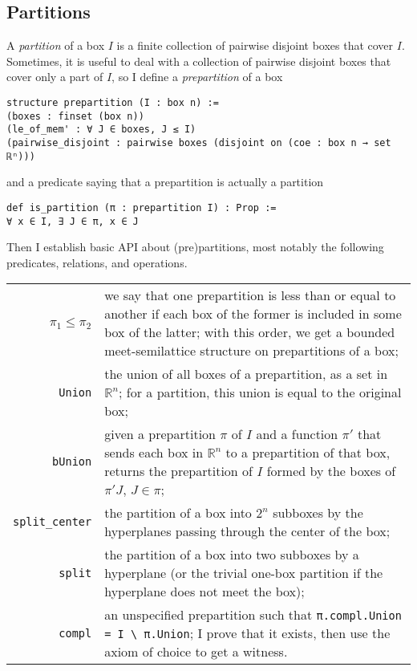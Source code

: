 \documentclass[a4paper, UKenglish,cleveref, autoref, thm-restate]{lipics-v2021}
\newcommand{\bbR}{\mathbb{R}}
\begin{document}
\subsection{Partitions}\label{sec:partitions}

A \emph{partition} of a box \(I\) is a finite collection of pairwise
disjoint boxes that cover \(I\). Sometimes, it is useful to deal with a
collection of pairwise disjoint boxes that cover only a part of \(I\),
so I define a \emph{prepartition} of a box

\begin{lstlisting}[caption=Definition of a prepartition]
structure prepartition (I : box n) :=
(boxes : finset (box n))
(le_of_mem' : ∀ J ∈ boxes, J ≤ I)
(pairwise_disjoint : pairwise boxes (disjoint on (coe : box n → set ℝⁿ)))
\end{lstlisting}

and a predicate saying that a prepartition is actually a partition

\begin{lstlisting}[caption={A prepartition is a partition if it covers the whole box}]
def is_partition (π : prepartition I) : Prop :=
∀ x ∈ I, ∃ J ∈ π, x ∈ J
\end{lstlisting}

Then I establish basic API about (pre)partitions, most notably the
following predicates, relations, and operations.

\noindent%
\begin{tabular}{rp{10cm}}
  \(\pi_{1}\le\pi_{2}\)&we say that one prepartition is less than or equal to another if each box of the former is included in some box of the latter; with this order, we get a bounded meet-semilattice structure on prepartitions of a box;\\
  \lstinline=Union=&the union of all boxes of a prepartition, as a set in \(\bbR^{n}\); for a partition, this union is equal to the original box;\\
  \lstinline=bUnion=&given a prepartition \(\pi\) of \(I\) and a function \(\pi'\) that sends each box in \(\bbR^{n}\) to a prepartition of that box, returns the prepartition of \(I\) formed by the boxes of \(\pi' J\), \(J \in \pi\);\\
  \lstinline=split_center=&the partition of a box into \(2^{n}\) subboxes by the hyperplanes passing through the center of the box;\\
  \lstinline=split=&the partition of a box into two subboxes by a hyperplane (or the trivial one-box partition if the hyperplane does not meet the box);\\
  \lstinline=compl=&an unspecified prepartition such that \lstinline~π.compl.Union = I \ π.Union~; I prove that it exists, then use the axiom of choice to get a witness.
\end{tabular}
\end{document}
